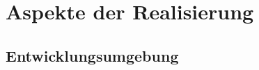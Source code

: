 \chapter{Aspekte der Realisierung}
\label{cha:realisierung}

\section{Entwicklungsumgebung}
\label{sec:entwicklungsumgebung}
